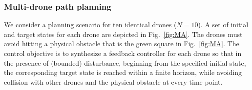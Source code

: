 \subsubsection{Multi-drone path planning}\label{sec:Multirobot}
We consider a planning scenario for ten identical drones ($N=10$). A set of initial and target states for each drone are depicted in Fig.~\ref{fig:MA}. The drones must avoid hitting a physical obstacle that is the green square in Fig.~\ref{fig:MA}. %
The control objective is to synthesize a feedback controller for each drone so that in the presence of (bounded) disturbance, beginning from the specified initial state, the corresponding target state is reached within a finite horizon, while avoiding collision with other drones and the physical obstacle at every time point. 

